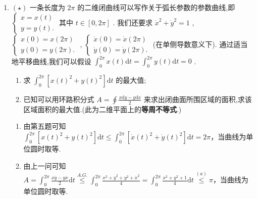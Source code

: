 \begin{enumerate}
\begin{solution}
\[\begin{aligned}
            &=\int_0^\pi (\cos^2{x}\cdot T^2(x)+2\sin{x}\cos{x}T(x)T'(x)+\sin^2{x}(T'(x))^2)\mathrm{d}x\\
            &\geq \int_0^\pi (\cos^2{x}\cdot T^2(x)+2\sin{x}\cos{x}\cdot T(x)T'(x))\mathrm{d}x\\
            &=\int_0^\pi \cos^2{x}\cdot T^2(x)\mathrm{d}x + \left.T^2(x)\sin{x}\cos{x}\right|_0^\pi-\int_0^\pi T^2(x)(\sin{x}\cos{x})'\mathrm{d}x\\
            &=\int_0^\pi T^2(x)(\cos^2{x}-\cos^2{x}+\sin^2{x})\mathrm{d}x+0=\int_0^\pi T^2(x)\sin^2{x}\mathrm{d}x=LHS.
        \end{aligned}
        \]
    \end{solution}
    \item[6.]$(\star)$ 一条长度为 \(2\pi\) 的二维闭曲线可以写作关于弧长参数的参数曲线,即 
    \(\left\{ 
        \begin{array}{l}
            x = x(t) \\ 
            y = y(t).
        \end{array} 
        \right.\) 
    其中 \(t \in [0,2\pi ]\) . 
    我们还要求 \(\displaystyle\dot{x}^{2} + \dot{y}^{2} = 1\) , 
    \(\left\{ 
        \begin{array}{l}
            x(0) = x(2\pi) \\ 
            y(0) = y(2\pi).
        \end{array} 
        \right.\) , 
        \(\left\{ 
        \begin{array}{l}
            \dot{x}(0) = \dot{x}(2\pi) \\ 
            \dot{y}(0) = \dot{y}(2\pi).
        \end{array} \right.\) 
        (在单侧导数意义下). 
        通过适当地平移曲线,我们可以假设 \(\displaystyle\int_{0}^{2\pi} x(t)\mathrm{d}t = \displaystyle\int_{0}^{2\pi} y(t)\mathrm{d}t = 0\) .
    \begin{enumerate}
        \item[(a)]求 \(\displaystyle\int_{0}^{2\pi}[x(t)^{2} + y(t)^{2}]\mathrm{d}t\) 的最大值;
        \item[(b)]已知可以用环路积分式 \(\displaystyle A = \oint \frac{x\mathrm{d}y - y\mathrm{d}x}{2}\) 来求出闭曲面所围区域的面积,求该区域面积的最大值.(此为二维平面上的\textbf{等周不等式}.)
    \end{enumerate}
    \begin{solution}
        \begin{enumerate}
            \item[(a)]由第五题可知 $\displaystyle \int_{0}^{2\pi}[x(t)^{2} + y(t)^{2}]\mathrm{d}t\leq \int_{0}^{2\pi}[\dot{x}(t)^{2} + \dot{y}(t)^{2}]\mathrm{d}t = 2\pi$，当曲线为单位圆时取等.
            \item[(b)]由上一问可知 $\displaystyle A=\int_0^{2\pi}\frac{x\dot{y}-y\dot{x}}{2}\mathrm{d}t\overset{A.G.}{\leq} \int_0^{2\pi}\frac{x^2+\dot{y}^2+y^2+\dot{x}^2}{4}=\int_0^{2\pi}\frac{x^2+y^2+1}{4}\mathrm{d}t\overset{(a)}{\leq}\pi$，当曲线为单位圆时取等.
        \end{enumerate}
    \end{solution}
\end{enumerate}

